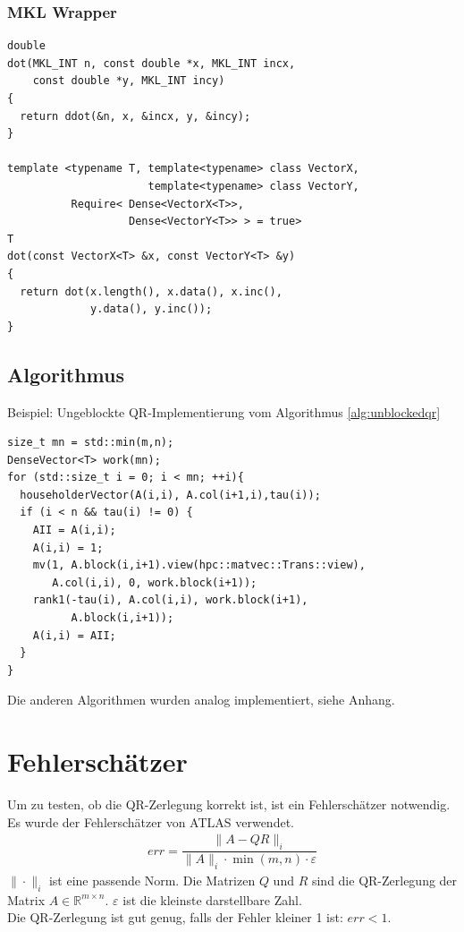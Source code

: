 \subsubsection{MKL Wrapper}
\lstset{numbers=left,firstnumber=14}
\begin{lstlisting}
double
dot(MKL_INT n, const double *x, MKL_INT incx,
    const double *y, MKL_INT incy)
{
  return ddot(&n, x, &incx, y, &incy);
}

template <typename T, template<typename> class VectorX,
                      template<typename> class VectorY,
          Require< Dense<VectorX<T>>,
                   Dense<VectorY<T>> > = true>
T
dot(const VectorX<T> &x, const VectorY<T> &y)
{
  return dot(x.length(), x.data(), x.inc(), 
             y.data(), y.inc());
}
\end{lstlisting}



\subsection{Algorithmus}

Beispiel: Ungeblockte QR-Implementierung vom Algorithmus \ref{alg:unblockedqr}
\lstset{numbers=left,firstnumber=1}
\begin{lstlisting}
size_t mn = std::min(m,n);
DenseVector<T> work(mn);
for (std::size_t i = 0; i < mn; ++i){
  householderVector(A(i,i), A.col(i+1,i),tau(i));
  if (i < n && tau(i) != 0) {
    AII = A(i,i);
    A(i,i) = 1;
    mv(1, A.block(i,i+1).view(hpc::matvec::Trans::view),
       A.col(i,i), 0, work.block(i+1));
    rank1(-tau(i), A.col(i,i), work.block(i+1), 
          A.block(i,i+1));
    A(i,i) = AII;
  }
}
\end{lstlisting}

Die anderen Algorithmen wurden analog implementiert, siehe Anhang.

\section{Fehlerschätzer}

Um zu testen, ob die QR-Zerlegung korrekt ist, ist ein Fehlerschätzer notwendig.
Es wurde der Fehlerschätzer von ATLAS \cite{atlas} verwendet.
\begin{align}
err = \dfrac{\|A - QR\|_i}{\|A\|_i \cdot \min(m,n) \cdot \varepsilon}
\end{align}
$\|\cdot\|_i$ ist eine passende Norm.
Die Matrizen $Q$ und $R$ sind die QR-Zerlegung der Matrix $A \in \mathbb{R}^{m \times n}$.
$\varepsilon$ ist die kleinste darstellbare Zahl.\\
Die QR-Zerlegung ist gut genug, falls der Fehler kleiner 1 ist: $ err < 1 $.

